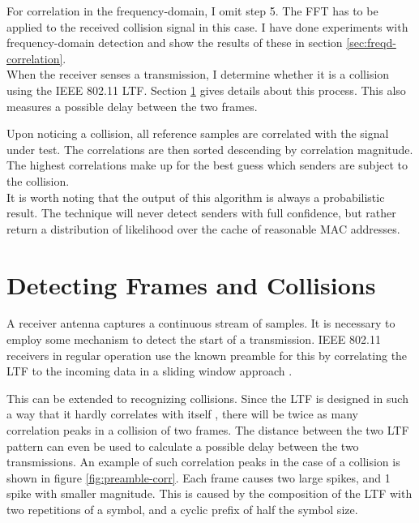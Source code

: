 For correlation in the frequency-domain, I omit step 5. The \gls{FFT} has to be applied to the received collision signal in this case. I have done experiments with frequency-domain detection and show the results of these in section \ref{sec:freqd-correlation}.\\

When the receiver senses a transmission, I determine whether it is a collision using the IEEE 802.11 \gls{LTF}. Section \ref{sec:preamble-corr} gives details about this process. This also measures a possible delay between the two frames.

Upon noticing a collision, all reference samples are correlated with the signal under test. The correlations are then sorted descending by correlation magnitude. The highest correlations make up for the best guess which senders are subject to the collision.\\

It is worth noting that the output of this algorithm is always a probabilistic result. The technique will never detect senders with full confidence, but rather return a distribution of likelihood over the cache of reasonable \gls{MAC} addresses.



\section{Detecting Frames and Collisions}\label{sec:preamble-corr}

A receiver antenna captures a continuous stream of samples. It is necessary to employ some mechanism to detect the start of a transmission. IEEE 802.11 receivers in regular operation use the known preamble for this by correlating the \gls{LTF} to the incoming data in a sliding window approach \cite{perahia2013}.

This can be extended to recognizing collisions. Since the \gls{LTF} is designed in such a way that it hardly correlates with itself \cite{ieee2012}, there will be twice as many correlation peaks in a collision of two frames. The distance between the two \gls{LTF} pattern can even be used to calculate a possible delay between the two transmissions. An example of such correlation peaks in the case of a collision is shown in figure \ref{fig:preamble-corr}. Each frame causes two large spikes, and 1 spike with smaller magnitude. This is caused by the composition of the \gls{LTF} with two repetitions of a symbol, and a cyclic prefix of half the symbol size.\\

